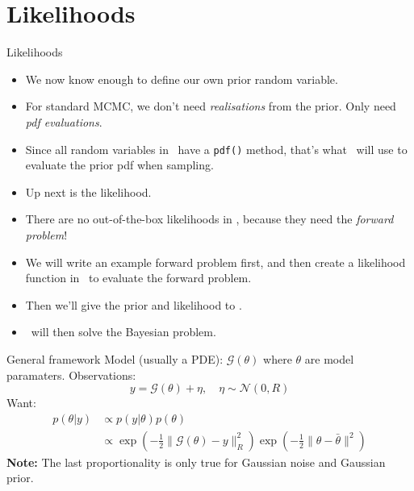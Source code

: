 \section{Likelihoods}
\begin{frame}[fragile]{Likelihoods}
  \begin{itemize}
    \item We now know enough to define our own prior random variable.
    \item For standard MCMC, we don't need \emph{realisations} from the
      prior.  Only need \emph{pdf evaluations}.
    \item Since all random variables in \Queso\ have a \texttt{pdf()} method,
      that's what \Queso\ will use to evaluate the prior pdf when sampling.
    \item Up next is the likelihood.
    \item There are no out-of-the-box likelihoods in \Queso, because they need
      the \emph{forward problem}!
    \item We will write an example forward problem first, and then create a
      likelihood function in \Queso\ to evaluate the forward problem.
    \item Then we'll give the prior and likelihood to \Queso.
    \item \Queso\ will then solve the Bayesian problem.
  \end{itemize}
\end{frame}

\begin{frame}{General framework}
  Model (usually a PDE): $\mathcal{G}(\theta)$ where $\theta$ are model
  paramaters.
  \linebreak
  \linebreak
  Observations:
  \begin{equation*}
    y = \mathcal{G}(\theta) + \eta, \quad \eta \sim \mathcal{N}(0, R)
  \end{equation*}
  Want:
  \begin{align*}
    p(\theta | y) &\propto p(y | \theta) p(\theta) \\
    &\propto \exp \left( -\frac12 \| \mathcal{G}(\theta) - y \|^2_R \right)
    \exp \left( -\frac12 \| \theta - \bar{\theta} \|^2 \right)
  \end{align*}
  \textbf{Note:} The last proportionality is only true for Gaussian noise and
  Gaussian prior.
\end{frame}

